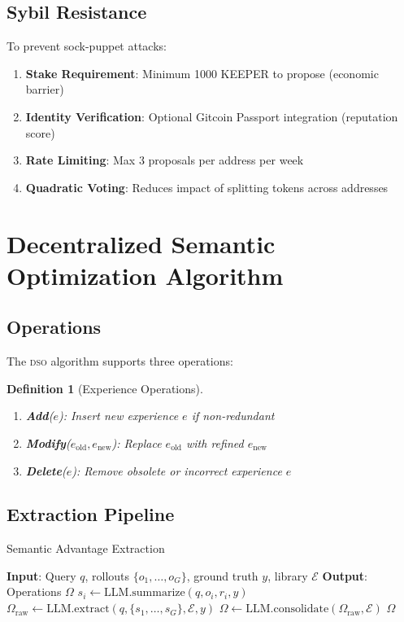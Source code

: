 \documentclass[11pt,letterpaper]{article}
\newtheorem{definition}{Definition}[section]
\newcommand{\DSO}{\textsc{dso}}
\begin{document}
\subsection{Sybil Resistance}

To prevent sock-puppet attacks:

\begin{enumerate}
    \item \textbf{Stake Requirement}: Minimum 1000 KEEPER to propose (economic barrier)
    \item \textbf{Identity Verification}: Optional Gitcoin Passport integration (reputation score)
    \item \textbf{Rate Limiting}: Max 3 proposals per address per week
    \item \textbf{Quadratic Voting}: Reduces impact of splitting tokens across addresses
\end{enumerate}

\section{Decentralized Semantic Optimization Algorithm}
\label{sec:dso}

\subsection{Operations}

The \DSO{} algorithm supports three operations:

\begin{definition}[Experience Operations]
\begin{enumerate}
    \item \textbf{Add}($e$): Insert new experience $e$ if non-redundant
    \item \textbf{Modify}($e_{\text{old}}, e_{\text{new}}$): Replace $e_{\text{old}}$ with refined $e_{\text{new}}$
    \item \textbf{Delete}($e$): Remove obsolete or incorrect experience $e$
\end{enumerate}
\end{definition}

\subsection{Extraction Pipeline}

\begin{algorithm}[t]
\caption{Semantic Advantage Extraction}
\label{alg:extraction}
\begin{algorithmic}[1]
\STATE \textbf{Input}: Query $q$, rollouts $\{o_1, \ldots, o_G\}$, ground truth $y$, library $\mathcal{E}$
\STATE \textbf{Output}: Operations $\Omega$
\STATE {}
    \STATE $s_i \leftarrow \text{LLM.summarize}(q, o_i, r_i, y)$
\ENDFOR
\STATE {}
\STATE $\Omega_{\text{raw}} \leftarrow \text{LLM.extract}(q, \{s_1, \ldots, s_G\}, \mathcal{E}, y)$
\STATE {}
\STATE $\Omega \leftarrow \text{LLM.consolidate}(\Omega_{\text{raw}}, \mathcal{E})$
\RETURN $\Omega$
\end{algorithmic}
\end{algorithm}
\end{document}
